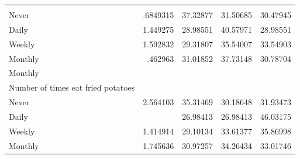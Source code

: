 \documentclass{article}
\begin{document}
\begin{table}[!h]
{\begin{tabular}{lllll}
			\multicolumn{1}{r}{} \\
			\multicolumn{1}{l}{\hspace{5em}Never} &
			\multicolumn{1}{|r}{.6849315} &
			\multicolumn{1}{r}{37.32877} &
			\multicolumn{1}{r}{31.50685} &
			\multicolumn{1}{r}{30.47945} \\
			\multicolumn{1}{l}{\hspace{5em}Daily} &
			\multicolumn{1}{|r}{1.449275} &
			\multicolumn{1}{r}{28.98551} &
			\multicolumn{1}{r}{40.57971} &
			\multicolumn{1}{r}{28.98551} \\
			\multicolumn{1}{l}{\hspace{5em}Weekly} &
			\multicolumn{1}{|r}{1.592832} &
			\multicolumn{1}{r}{29.31807} &
			\multicolumn{1}{r}{35.54007} &
			\multicolumn{1}{r}{33.54903} \\
			\multicolumn{1}{l}{\hspace{5em}Monthly} &
			\multicolumn{1}{|r}{.462963} &
			\multicolumn{1}{r}{31.01852} &
			\multicolumn{1}{r}{37.73148} &
			\multicolumn{1}{r}{30.78704} \\
			\multicolumn{1}{l}{\hspace{3em}Monthly} &
			\multicolumn{1}{|r}{} &
			\multicolumn{1}{r}{} &
			\multicolumn{1}{r}{} &
			\multicolumn{1}{r}{} \\
			\multicolumn{1}{l}{\hspace{4em}Number of times eat fried potatoes} &
			\multicolumn{1}{|r}{} &
			\multicolumn{1}{r}{} &
			\multicolumn{1}{r}{} &
			\multicolumn{1}{r}{} \\
			\multicolumn{1}{l}{\hspace{5em}Never} &
			\multicolumn{1}{|r}{2.564103} &
			\multicolumn{1}{r}{35.31469} &
			\multicolumn{1}{r}{30.18648} &
			\multicolumn{1}{r}{31.93473} \\
			\multicolumn{1}{l}{\hspace{5em}Daily} &
			\multicolumn{1}{|r}{} &
			\multicolumn{1}{r}{26.98413} &
			\multicolumn{1}{r}{26.98413} &
			\multicolumn{1}{r}{46.03175} \\
			\multicolumn{1}{l}{\hspace{5em}Weekly} &
			\multicolumn{1}{|r}{1.414914} &
			\multicolumn{1}{r}{29.10134} &
			\multicolumn{1}{r}{33.61377} &
			\multicolumn{1}{r}{35.86998} \\
			\multicolumn{1}{l}{\hspace{5em}Monthly} &
			\multicolumn{1}{|r}{1.745636} &
			\multicolumn{1}{r}{30.97257} &
			\multicolumn{1}{r}{34.26434} &
			\multicolumn{1}{r}{33.01746} \\

\end{tabular}}
\end{table}
\end{document}
